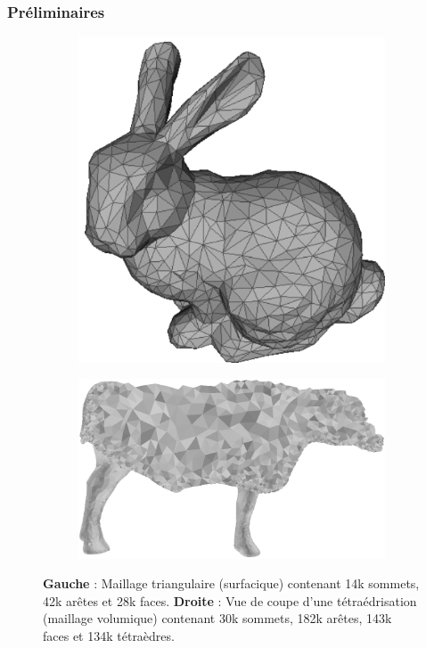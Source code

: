 \documentclass[9pt]{beamer}
\begin{document}
\begin{frame}
\small
\frametitle{Préliminaires}
\begin{figure}[H]
\centering
\begin{subfigure}{.5\textwidth}
  \centering
  \includegraphics[scale=0.13]{Images/bunny}
  \caption{}
\end{subfigure}%
\begin{subfigure}{.5\textwidth}
  \centering
  \includegraphics[scale=0.09]{Images/cow_cut}
  \caption{}
\end{subfigure}
\caption{\textbf{Gauche} : Maillage triangulaire (surfacique) contenant 14k sommets, 42k arêtes et 28k faces. \textbf{Droite} : Vue de coupe d'une tétraédrisation (maillage volumique) contenant 30k sommets, 182k arêtes, 143k faces et 134k tétraèdres.}

\end{figure}
\end{frame}
\end{document}

